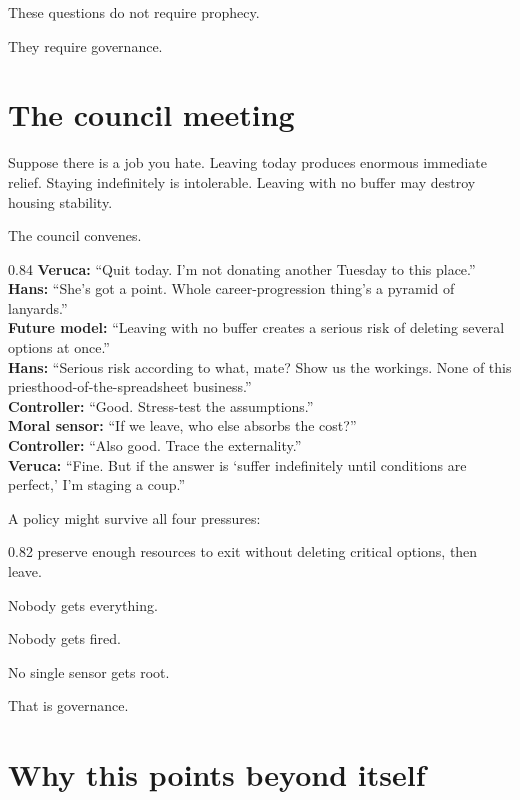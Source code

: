 \documentclass[10pt,letterpaper]{article}
\newenvironment{paperbody}
  {\begingroup\justifying}
  {\par\endgroup}
\newenvironment{voicebox}
  {\Needspace{3.5\baselineskip}\par\vspace{0.22em}\begin{center}\begingroup
   \begin{lrbox}{\voiceboxsave}\begin{varwidth}{0.82\linewidth}
   \small\rmfamily\upshape\RaggedRight}
  {\end{varwidth}\end{lrbox}\fbox{\usebox{\voiceboxsave}}
   \endgroup\end{center}\vspace{0.22em}}
\newenvironment{dialoguebox}
  {\Needspace{5\baselineskip}\par\vspace{0.26em}\begin{center}\begingroup
   \begin{lrbox}{\dialogueboxsave}\begin{varwidth}{0.84\linewidth}
   \small\rmfamily\upshape\RaggedRight}
  {\end{varwidth}\end{lrbox}\fbox{\usebox{\dialogueboxsave}}
   \endgroup\end{center}\vspace{0.26em}}
\let\oldsection\section
\renewcommand{\section}{\Needspace{6\baselineskip}\oldsection}
\begin{document}
\begin{paperbody}
These questions do not require prophecy.

They require governance.

\section{The council meeting}\label{the-council-meeting}

Suppose there is a job you hate. Leaving today produces enormous
immediate relief. Staying indefinitely is intolerable. Leaving with no
buffer may destroy housing stability.

The council convenes.

\begin{dialoguebox}
\textbf{Veruca:} ``Quit today. I'm not donating another Tuesday to this
place.''\\[0.35em]
\textbf{Hans:} ``She's got a point. Whole career-progression thing's a
pyramid of lanyards.''\\[0.35em]
\textbf{Future model:} ``Leaving with no buffer creates a serious risk
of deleting several options at once.''\\[0.35em]
\textbf{Hans:} ``Serious risk according to what, mate? Show us the
workings. None of this priesthood-of-the-spreadsheet business.''\\[0.35em]
\textbf{Controller:} ``Good. Stress-test the assumptions.''\\[0.35em]
\textbf{Moral sensor:} ``If we leave, who else absorbs the cost?''\\[0.35em]
\textbf{Controller:} ``Also good. Trace the externality.''\\[0.35em]
\textbf{Veruca:} ``Fine. But if the answer is `suffer indefinitely until
conditions are perfect,' I'm staging a coup.''
\end{dialoguebox}

A policy might survive all four pressures:

\begin{voicebox}
preserve enough resources to exit without deleting critical options,
then leave.
\end{voicebox}

Nobody gets everything.

Nobody gets fired.

No single sensor gets root.

That is governance.

\section{Why this points beyond
itself}\label{why-this-points-beyond-itself}


\end{paperbody}
\end{document}
